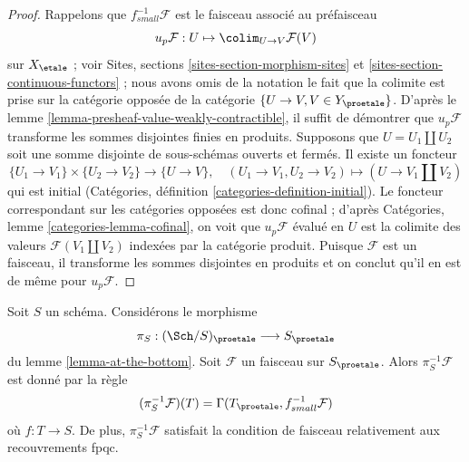 \begin{proof}
Rappelons que $f_{small}^{-1}\mathcal{F}$ est le faisceau associé au
préfaisceau
$$
u_p\mathcal{F} : U \mapsto \colim_{U \to V} \mathcal{F}(V)
$$
sur $X_\etale$ ; voir Sites, sections \ref{sites-section-morphism-sites} et
\ref{sites-section-continuous-functors} ; nous avons omis de la notation le fait
que la colimite est prise sur la catégorie opposée de la catégorie
$\{U \to V, V \in Y_\proetale\}$. D'après le
lemme \ref{lemma-presheaf-value-weakly-contractible},
il suffit de démontrer que $u_p\mathcal{F}$ transforme les sommes disjointes finies
en produits.
Supposons que $U = U_1 \amalg U_2$ soit une somme disjointe de sous-schémas
ouverts et fermés. Il existe un foncteur
$$
\{U_1 \to V_1\} \times \{U_2 \to V_2\} \longrightarrow
\{U \to V\},\quad
(U_1 \to V_1, U_2 \to V_2) \longmapsto (U \to V_1 \amalg V_2)
$$
qui est initial (Catégories, définition \ref{categories-definition-initial}).
Le foncteur correspondant sur les catégories opposées est donc cofinal ;
d'après Catégories, lemme \ref{categories-lemma-cofinal}, on voit
que $u_p\mathcal{F}$ évalué en $U$ est la colimite des valeurs
$\mathcal{F}(V_1 \amalg V_2)$ indexées par la catégorie produit.
Puisque $\mathcal{F}$ est un faisceau, il transforme les sommes disjointes en produits et
on conclut qu'il en est de même pour $u_p\mathcal{F}$.
\end{proof}

\begin{lemma}
\label{lemma-describe-pullback}
Soit $S$ un schéma. Considérons le morphisme
$$
\pi_S : (\Sch/S)_\proetale \longrightarrow S_\proetale
$$
du lemme \ref{lemma-at-the-bottom}. Soit $\mathcal{F}$ un faisceau sur
$S_\proetale$. Alors $\pi_S^{-1}\mathcal{F}$ est donné par la règle
$$
(\pi_S^{-1}\mathcal{F})(T) = \Gamma(T_\proetale, f_{small}^{-1}\mathcal{F})
$$
où $f : T \to S$. De plus, $\pi_S^{-1}\mathcal{F}$ satisfait la
condition de faisceau relativement aux recouvrements fpqc.
\end{lemma}

